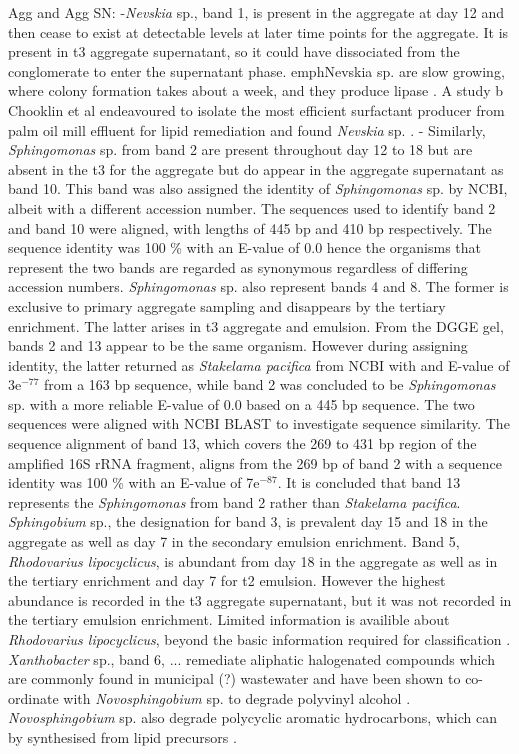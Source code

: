 \documentclass[11pt]{article}
\begin{document}
Agg and Agg SN:
-\emph{Nevskia} sp., band 1, is present in the aggregate at day 12 and then cease to exist at detectable levels at later time points for the aggregate. It is present in t3 aggregate supernatant, so it could have dissociated from the conglomerate to enter the supernatant phase. emph{Nevskia} sp. are slow growing, where colony formation takes about a week, and they produce lipase \cite{kim2011nevskia}. A study b Chooklin et al endeavoured to isolate the most efficient surfactant producer from palm oil mill effluent for lipid remediation and found \emph{Nevskia} sp. \cite{chooklinutilization}.
- Similarly, \emph{Sphingomonas} sp. from band 2 are present throughout day 12 to 18 but are absent in the t3 for the aggregate but do appear in the aggregate supernatant as band 10. This band was also assigned the identity of \emph{Sphingomonas} sp. by NCBI, albeit with a different accession number. The sequences used to identify band 2 and band 10 were aligned, with lengths of 445 bp and 410 bp respectively. The sequence identity was 100 \% with an E-value of 0.0 hence the organisms that represent the two bands are regarded as synonymous regardless of differing accession numbers.
\emph{Sphingomonas} sp. also represent bands 4 and 8. The former is exclusive to primary aggregate sampling and disappears by the tertiary enrichment. The latter arises in t3 aggregate and emulsion.
From the DGGE gel, bands 2 and 13 appear to be the same organism. However during assigning identity, the latter returned as \emph{Stakelama pacifica} from NCBI with and E-value of 3e$^{-77}$ from a 163 bp sequence, while band 2 was concluded to be \emph{Sphingomonas} sp. with a more reliable E-value of 0.0 based on a 445 bp sequence. The two sequences were aligned with NCBI BLAST to investigate sequence similarity. The sequence alignment of band 13, which covers the 269 to 431 bp region of the amplified 16S rRNA fragment, aligns from the 269 bp of band 2 with a sequence identity was 100 \% with an E-value of 7e$^{-87}$. It is concluded that band 13 represents the \emph{Sphingomonas} from band 2 rather than \emph{Stakelama pacifica}.
\emph{Sphingobium} sp., the designation for band 3, is prevalent day 15 and 18 in the aggregate as well as day 7 in the secondary emulsion enrichment.
Band 5, \emph{Rhodovarius lipocyclicus}, is abundant from day 18 in the aggregate as well as in the tertiary enrichment and day 7 for t2 emulsion. However the highest abundance is recorded in the t3 aggregate supernatant, but it was not recorded in the tertiary emulsion enrichment. Limited information is availible about \emph{Rhodovarius lipocyclicus}, beyond the basic information required for classification \cite{kampfer2004rhodovarius}.
\emph{Xanthobacter} sp., band 6, ... remediate aliphatic halogenated compounds which are commonly found in municipal (?) wastewater \cite{janssen1985degradation} and have been shown to co-ordinate with \emph{Novosphingobium} sp. to degrade polyvinyl alcohol \cite{rong2009symbiotic}. \emph{Novosphingobium} sp. also degrade polycyclic aromatic hydrocarbons, which can by synthesised from lipid precursors \cite{addison2007novosphingobium}.
\end{document}
